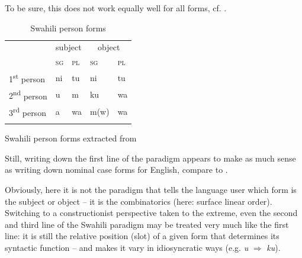 \documentclass[output=paper]{langsci/langscibook}
\begin{document}
To be sure, this does not work equally well for all forms, cf. .

\begin{table}
\caption{Swahili person forms \citep[15, 102; only M-/WA-class]{AlmasiAlmasi2014}\label{tab:reiner:6}}
\begin{tabular}{lllll}
\lsptoprule
& \multicolumn{2}{c}{subject} & \multicolumn{2}{c}{object}\\\cmidrule(lr){2-3}\cmidrule(lr){4-5}
& \textsc{sg} & \textsc{pl} & \textsc{sg} & \textsc{pl}\\\midrule
{1\textsuperscript{st}} {person} & ni & tu & ni & tu\\
{2\textsuperscript{nd}} {person} & u & m & ku & wa\\
{3\textsuperscript{rd}} {person} & a & wa & m(w) & wa\\
\lspbottomrule
\end{tabular}
\end{table}

\begin{table}
\begin{floatrow}
\captionsetup{margin=.05\linewidth}
        {\caption{Swahili person forms extracted from \label{tab:reiner:7}}}
        {\caption{English nominal case forms\label{tab:reiner:8}}}
\end{floatrow}
\end{table}

Still, writing down the first line of the paradigm appears to make as much sense as writing down nominal case forms for English, compare  to .

Obviously, here it is not the paradigm that tells the language user which form is the subject or object – it is the combinatorics (here: surface linear order). Switching to a constructionist perspective taken to the extreme, even the second and third line of the Swahili paradigm may be treated very much like the first line: it is still the relative position (slot) of a given form that determines its syntactic function – and makes it vary in idiosyncratic ways (e.g. \textit{u} ${\Rightarrow}$ \textit{ku}).
\end{document}
